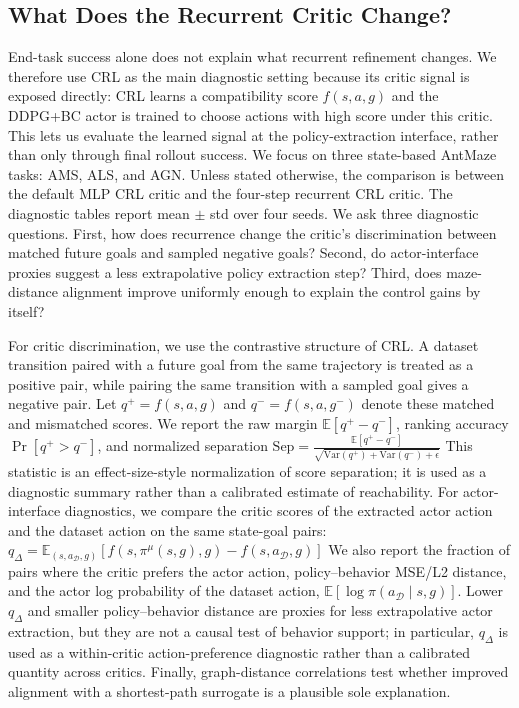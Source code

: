 \documentclass{article}
\begin{document}
\subsection{What Does the Recurrent Critic Change?}\label{section:why better}
End-task success alone does not explain what recurrent refinement changes. We therefore use CRL as the main diagnostic setting because its critic signal is exposed directly: CRL learns a compatibility score $f(s,a,g)$ and the DDPG+BC actor is trained to choose actions with high score under this critic. This lets us evaluate the learned signal at the policy-extraction interface, rather than only through final rollout success. We focus on three state-based AntMaze tasks: AMS, ALS, and AGN. Unless stated otherwise, the comparison is between the default MLP CRL critic and the four-step recurrent CRL critic. The diagnostic tables report mean $\pm$ std over four seeds. We ask three diagnostic questions. First, how does recurrence change the critic's discrimination between matched future goals and sampled negative goals? Second, do actor-interface proxies suggest a less extrapolative policy extraction step? Third, does maze-distance alignment improve uniformly enough to explain the control gains by itself?

For critic discrimination, we use the contrastive structure of CRL. A dataset transition paired with a future goal from the same trajectory is treated as a positive pair, while pairing the same transition with a sampled goal gives a negative pair. Let $q^+=f(s,a,g)$ and $q^-=f(s,a,g^-)$ denote these matched and mismatched scores. We report the raw margin $\mathbb{E}[q^+-q^-]$, ranking accuracy $\Pr[q^+>q^-]$, and normalized separation \(\mathrm{Sep}= \frac{\mathbb{E}[q^+-q^-]}{\sqrt{\mathrm{Var}(q^+) + \mathrm{Var}(q^-) + \epsilon}}\)
This statistic is an effect-size-style normalization of score separation; it is used as a diagnostic summary rather than a calibrated estimate of reachability.
For actor-interface diagnostics, we compare the critic scores of the extracted actor action and the dataset action on the same state-goal pairs:
\(
q_\Delta
=
\mathbb{E}_{(s,a_{\mathcal D},g)}
\left[
f(s,\pi^\mu(s,g),g)-f(s,a_{\mathcal D},g)
\right]
\)
We also report the fraction of pairs where the critic prefers the actor action, policy--behavior MSE/L2 distance, and the actor log probability of the dataset action, $\mathbb{E}[\log \pi(a_{\mathcal D}\mid s,g)]$. Lower $q_\Delta$ and smaller policy--behavior distance are proxies for less extrapolative actor extraction, but they are not a causal test of behavior support; in particular, $q_\Delta$ is used as a within-critic action-preference diagnostic rather than a calibrated quantity across critics. Finally, graph-distance correlations test whether improved alignment with a shortest-path surrogate is a plausible sole explanation.
\end{document}

